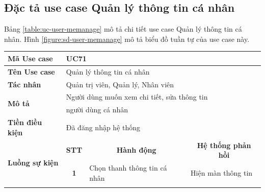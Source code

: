 \documentclass[../DoAn.tex]{subfiles}
\begin{document}
\subsection{Đặc tả use case Quản lý thông tin cá nhân}
\label{section:uc-user-memanage}
Bảng \ref{table:uc-user-memanage} mô tả chi tiết use case Quản lý thông tin cá nhân. Hình \ref{figure:sd-user-memanage} mô tả biểu đồ tuần tự của use case này.
\begin{table}[H]
    \begin{tabular}{|l|c|l|l|}
        \hline
        \textbf{Mã Use case}                    & \multicolumn{3}{l|}{UC71}                                                                                                                                      \\ \hline
        \textbf{Tên Use case}                   & \multicolumn{3}{l|}{Quản lý thông tin cá nhân}                                                                                                                 \\ \hline
        \textbf{Tác nhân}                       & \multicolumn{3}{l|}{Quản trị viên, Quản lý, Nhân viên}                                                                                                         \\ \hline
        \multirow{2}{*}{\textbf{Mô tả} }        & \multicolumn{3}{l|}{Người dùng muốn xem chi tiết, sửa thông tin}                                                                                               \\
                                                & \multicolumn{3}{l|}{người dùng cá nhân}                                                                                                                        \\ \hline
        \textbf{Tiền điều kiện}                 & \multicolumn{3}{l|}{Đã đăng nhập hệ thống}                                                                                                                     \\ \hline
        \multirow{5}{*}{\textbf{Luồng sự kiện}} & \multicolumn{1}{c|}{\textbf{STT}}                                & \multicolumn{1}{c|}{\textbf{Hành động}}   & \multicolumn{1}{c|}{\textbf{Hệ thống phản hồi}} \\ \cline{2-4}
                                                & \multirow{1}{*}{\textbf{1}}                                      & Chọn thanh thông tin cá nhân              & Hiện màn thông tin                              \\ \cline{2-4}

\end{tabular}
\end{table}
\end{document}
